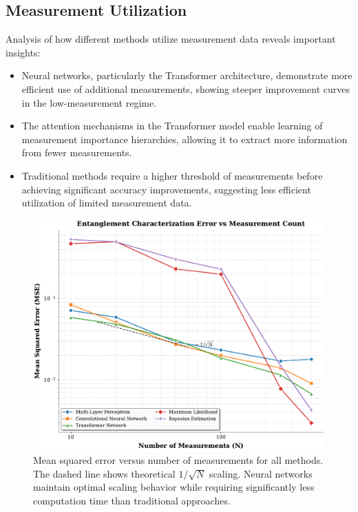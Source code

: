 \documentclass{optica-article}
\begin{document}
\subsection{Measurement Utilization}

Analysis of how different methods utilize measurement data reveals important insights:

\begin{itemize}
\item Neural networks, particularly the Transformer architecture, demonstrate more efficient use of additional measurements, showing steeper improvement curves in the low-measurement regime.

\item The attention mechanisms in the Transformer model enable learning of measurement importance hierarchies, allowing it to extract more information from fewer measurements.

\item Traditional methods require a higher threshold of measurements before achieving significant accuracy improvements, suggesting less efficient utilization of limited measurement data.
\end{itemize}

\begin{figure}[H]
\centering
\includegraphics[width=\linewidth]{../plots/mse_vs_measurements.pdf}
\caption{Mean squared error versus number of measurements for all methods. The dashed line shows theoretical $1/\sqrt{N}$ scaling. Neural networks maintain optimal scaling behavior while requiring significantly less computation time than traditional approaches.}
\label{fig:mse_vs_measurements}
\end{figure}
\end{document}
